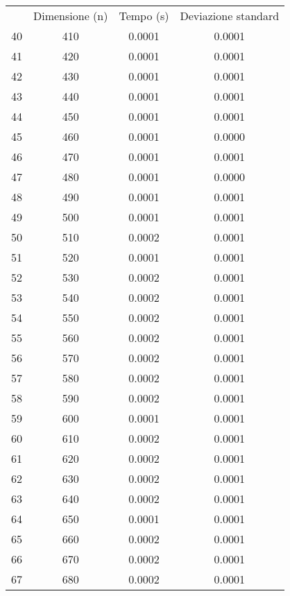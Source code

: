 \begin{table}
\centering
\begin{adjustbox}{width=1\textwidth/2}
\begin{tabular}{|c|c|c|c|}
\hline
 & Dimensione (n) & Tempo (s) & Deviazione standard \\
40 & 410 & 0.0001 & 0.0001 \\
\cline{1-4}
41 & 420 & 0.0001 & 0.0001 \\
\cline{1-4}
42 & 430 & 0.0001 & 0.0001 \\
\cline{1-4}
43 & 440 & 0.0001 & 0.0001 \\
\cline{1-4}
44 & 450 & 0.0001 & 0.0001 \\
\cline{1-4}
45 & 460 & 0.0001 & 0.0000 \\
\cline{1-4}
46 & 470 & 0.0001 & 0.0001 \\
\cline{1-4}
47 & 480 & 0.0001 & 0.0000 \\
\cline{1-4}
48 & 490 & 0.0001 & 0.0001 \\
\cline{1-4}
49 & 500 & 0.0001 & 0.0001 \\
\cline{1-4}
50 & 510 & 0.0002 & 0.0001 \\
\cline{1-4}
51 & 520 & 0.0001 & 0.0001 \\
\cline{1-4}
52 & 530 & 0.0002 & 0.0001 \\
\cline{1-4}
53 & 540 & 0.0002 & 0.0001 \\
\cline{1-4}
54 & 550 & 0.0002 & 0.0001 \\
\cline{1-4}
55 & 560 & 0.0002 & 0.0001 \\
\cline{1-4}
56 & 570 & 0.0002 & 0.0001 \\
\cline{1-4}
57 & 580 & 0.0002 & 0.0001 \\
\cline{1-4}
58 & 590 & 0.0002 & 0.0001 \\
\cline{1-4}
59 & 600 & 0.0001 & 0.0001 \\
\cline{1-4}
60 & 610 & 0.0002 & 0.0001 \\
\cline{1-4}
61 & 620 & 0.0002 & 0.0001 \\
\cline{1-4}
62 & 630 & 0.0002 & 0.0001 \\
\cline{1-4}
63 & 640 & 0.0002 & 0.0001 \\
\cline{1-4}
64 & 650 & 0.0001 & 0.0001 \\
\cline{1-4}
65 & 660 & 0.0002 & 0.0001 \\
\cline{1-4}
66 & 670 & 0.0002 & 0.0001 \\
\cline{1-4}
67 & 680 & 0.0002 & 0.0001 \\
\cline{1-4}

\end{tabular}
\end{adjustbox}
\end{table}
